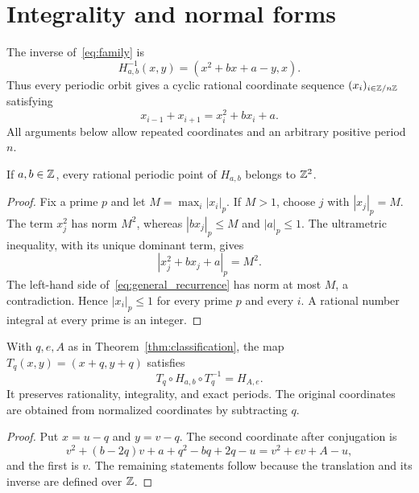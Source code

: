 \section{Integrality and normal forms}
\label{sec:normalization}

The inverse of~\eqref{eq:family} is
\[
 H_{a,b}^{-1}(x,y)=(x^2+bx+a-y,x).
\]
Thus every periodic orbit gives a cyclic rational coordinate sequence
\((x_i)_{i\in\mathbb{Z}/n\mathbb{Z}}\) satisfying
\begin{equation}
 x_{i-1}+x_{i+1}=x_i^2+bx_i+a.
 \label{eq:general_recurrence}
\end{equation}
All arguments below allow repeated coordinates and an arbitrary
positive period \(n\).

\begin{lemma}[Integrality]
\label{lem:integrality}
If \(a,b\in\mathbb{Z}\), every rational periodic point of \(H_{a,b}\) belongs
to \(\mathbb{Z}^2\).
\end{lemma}
\begin{proof}
Fix a prime \(p\) and let \(M=\max_i|x_i|_p\). If \(M>1\), choose
\(j\) with \(|x_j|_p=M\). The term \(x_j^2\) has norm \(M^2\),
whereas \(|bx_j|_p\le M\) and \(|a|_p\le1\). The ultrametric
inequality, with its unique dominant term, gives
\[
 |x_j^2+bx_j+a|_p=M^2.
\]
The left-hand side of~\eqref{eq:general_recurrence} has norm at most
\(M\), a contradiction. Hence \(|x_i|_p\le1\) for every prime \(p\)
and every \(i\). A rational number integral at every prime is an
integer.
\end{proof}

\begin{lemma}
\label{lem:translation}
With \(q,e,A\) as in Theorem~\ref{thm:classification}, the map
\(T_q(x,y)=(x+q,y+q)\) satisfies
\begin{equation}
 T_q\circ H_{a,b}\circ T_q^{-1}=H_{A,e}.
 \label{eq:translation}
\end{equation}
It preserves rationality, integrality, and exact periods. The original
coordinates are obtained from normalized coordinates by subtracting
\(q\).
\end{lemma}
\begin{proof}
Put \(x=u-q\) and \(y=v-q\). The second coordinate after conjugation
is
\[
 v^2+(b-2q)v+a+q^2-bq+2q-u
 =v^2+ev+A-u,
\]
and the first is \(v\). The remaining statements follow because the
translation and its inverse are defined over \(\mathbb{Z}\).
\end{proof}

